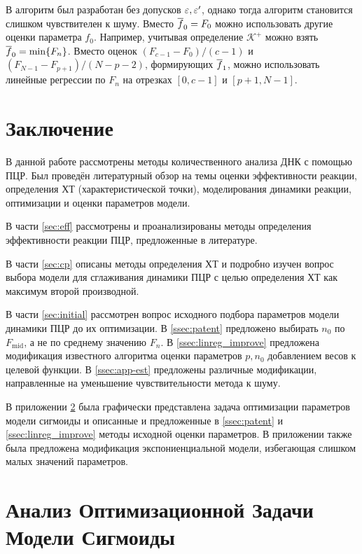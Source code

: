 В \cite{orekhovUnsupervisedMachineLearning2023} алгоритм был разработан без
допусков $\varepsilon,\varepsilon'$, однако тогда алгоритм становится слишком чувствителен к
шуму. Вместо $\overline{f}_0=F_0$ можно использовать другие оценки параметра $f_0$.
Например, учитывая определение $\mathcal K^{+}$ можно взять
$\overline{f}_0=\min\{F_{n}\}$. Вместо оценок $(F_{c-1}-F_0)/(c-1)$ и
$(F_{N-1}-F_{p+1})/(N-p-2)$, формирующих $\overline{f}_1$, можно использовать
линейные регрессии по $F_{n}$ на отрезках $[0,c-1]$ и $[p+1,N-1]$.

\section{Заключение}

В данной работе рассмотрены методы количественного анализа ДНК с помощью
ПЦР. Был проведён литературный обзор на темы оценки эффективности реакции,
определения ХТ (характеристической точки), моделирования динамики реакции,
оптимизации и оценки параметров модели.

В части \ref{sec:eff} рассмотрены и проанализированы методы определения
эффективности реакции ПЦР, предложенные в литературе.

В части \ref{sec:cp} описаны методы определения ХТ и подробно изучен вопрос
выбора модели для сглаживания динамики ПЦР с целью определения ХТ как максимум
второй производной.

В части \ref{sec:initial} рассмотрен вопрос исходного подбора параметров модели
динамики ПЦР до их оптимизации. В \ref{ssec:patent} предложено выбирать $n_0$
по $F_{\text{mid}}$, а не по среднему значению $F_{n}$. В
\ref{ssec:linreg_improve} предложена модификация известного алгоритма оценки
параметров $p,n_0$ добавлением весов к целевой функции. В \ref{ssec:app-est}
предложены различные модификации, направленные на уменьшение чувствительности
метода к шуму.

В приложении \ref{app:opt_an} была графически представлена задача оптимизации
параметров модели сигмоиды и описанные и предложенные в \ref{ssec:patent} и
\ref{ssec:linreg_improve} методы исходной оценки параметров. В приложении также
была предложена модификация экспониенциальной модели, избегающая слишком малых
значений параметров.

\newpage

\showbib{}

\newpage

\appendix{}

\section{Анализ Оптимизационной Задачи Модели Сигмоиды}\label{app:opt_an}

